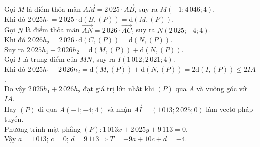 \begin{ex}
{\begin{center}
\begin{tikzpicture}[scale=1.4, font=\footnotesize, line join=round, line cap=round]
	\end{tikzpicture}
	\end{center}
	Gọi $M$ là điểm thỏa mãn $\overrightarrow{AM} = 2\,025 \cdot \overrightarrow{AB}$, suy ra $M\left(-1; 4\,046; 4\right)$.\\
	Khi đó $2\,025h_1 = 2\,025 \cdot \mathrm{d}\left(B, (P)\right) = \mathrm{d}\left(M, (P)\right)$.\\
	Gọi $N$ là điểm thỏa mãn $\overrightarrow{AN} = 2\,026 \cdot \overrightarrow{AC}$, suy ra $N\left(2\,025; -4; 4\right)$.\\
	Khi đó $2\,026h_2 = 2\,026 \cdot \mathrm{d}\left(C, (P)\right) = \mathrm{d}\left(N, (P)\right)$.\\
	Suy ra $2\,025h_1 + 2\,026h_2 = \mathrm{d}\left(M, (P)\right) + \mathrm{d}\left(N, (P)\right)$.\\
	Gọi $I$ là trung điểm của $MN$, suy ra $I\left(1\,012; 2\,021; 4\right)$.\\
	Khi đó $2\,025h_1 + 2\,026h_2 = \mathrm{d}\left(M, (P)\right) + \mathrm{d}\left(N, (P)\right) = 2\mathrm{d}\left(I, (P)\right) \le 2IA$.\\
	Do vậy $2\,025h_1 + 2\,026h_2$ đạt giá trị lớn nhất khi $(P)$ qua $A$ và vuông góc với $IA$.\\
	Hay $(P)$ đi qua $A\left(-1; -4; 4\right)$ và nhận $\overrightarrow{AI} = \left(1\,013; 2\,025; 0\right)$ làm vectơ pháp tuyến.\\
	Phương trình mặt phẳng $(P): 1\,013x + 2\,025y + 9\,113 = 0$.\\
	Vậy $a = 1\,013$; $c = 0$; $d = 9\,113 \Rightarrow T = -9a + 10c + d = -4$.
	}
\end{ex}
